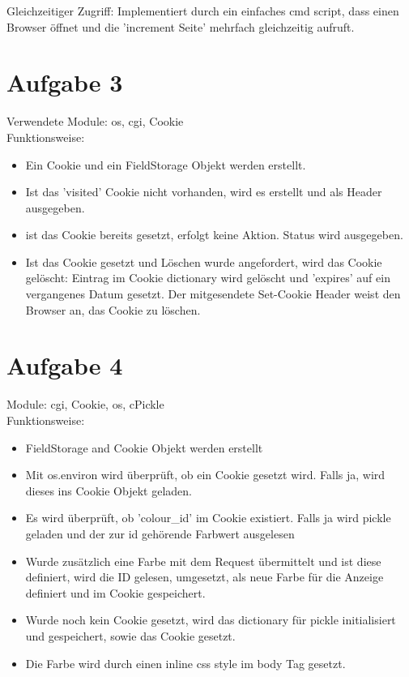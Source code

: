 \documentclass[12pt, a4paper]{report}
\begin{document}
Gleichzeitiger Zugriff:
Implementiert durch ein einfaches cmd script, dass einen Browser öffnet und die 'increment Seite' mehrfach gleichzeitig aufruft.

\section*{Aufgabe 3}
Verwendete Module: os, cgi, Cookie\\
Funktionsweise:\\
\begin{itemize}
	\item Ein Cookie und ein FieldStorage Objekt werden erstellt.
	\item Ist das 'visited' Cookie nicht vorhanden, wird es erstellt und als Header ausgegeben.
	\item ist das Cookie bereits gesetzt, erfolgt keine Aktion. Status wird ausgegeben.
	\item Ist das Cookie gesetzt und Löschen wurde angefordert, wird das Cookie gelöscht: Eintrag im Cookie dictionary wird gelöscht und 'expires' auf ein vergangenes Datum gesetzt. Der mitgesendete Set-Cookie Header weist den Browser an, das Cookie zu löschen.
\end{itemize}


\section*{Aufgabe 4}
Module: cgi, Cookie, os, cPickle\\
Funktionsweise:\\
\begin{itemize}
	\item FieldStorage and Cookie Objekt werden erstellt
	\item Mit os.environ wird überprüft, ob ein Cookie gesetzt wird. Falls ja, wird dieses ins Cookie Objekt geladen.
	\item Es wird überprüft, ob 'colour\_id' im Cookie existiert. Falls ja wird pickle geladen und der zur id gehörende Farbwert ausgelesen
	\item Wurde zusätzlich eine Farbe mit dem Request übermittelt und ist diese definiert, wird die ID gelesen, umgesetzt, als neue Farbe für die Anzeige definiert und im Cookie gespeichert.
	\item Wurde noch kein Cookie gesetzt, wird das dictionary für pickle initialisiert und gespeichert, sowie das Cookie gesetzt.
	\item Die Farbe wird durch einen inline css style im body Tag gesetzt.
\end{itemize}
\end{document}
